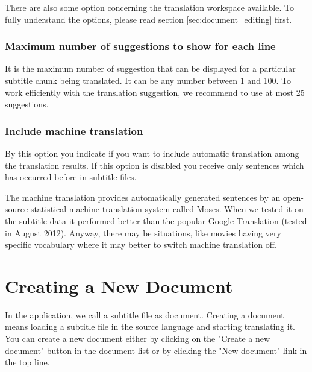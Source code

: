There are also some option concerning the translation workspace available. To fully understand the options, please read section \ref{sec:document_editing} first.

\subsubsection{Maximum number of suggestions to show for each line}

It is the maximum number of suggestion that can be displayed for a particular subtitle chunk being translated. It can be any number between 1 and 100. To work efficiently with the translation suggestion, we recommend to use at most 25 suggestions.

\subsubsection{Include machine translation}

By this option you indicate if you want to include automatic translation among the translation results. If this option is disabled you receive only sentences which has occurred before in subtitle files.

The machine translation provides automatically generated sentences by an open-source statistical machine translation system called Moses. When we tested it on the subtitle data it performed better than the popular Google Translation (tested in August 2012). Anyway, there may be situations, like movies having very specific vocabulary where it may better to switch machine translation off.

\section{Creating a New Document}

In the application, we call a subtitle file as document. Creating a document means loading a subtitle file in the source language and starting translating it. You can create a new document either by clicking on the "Create a new document" button in the document list or by clicking the "New document" link in the top line.

